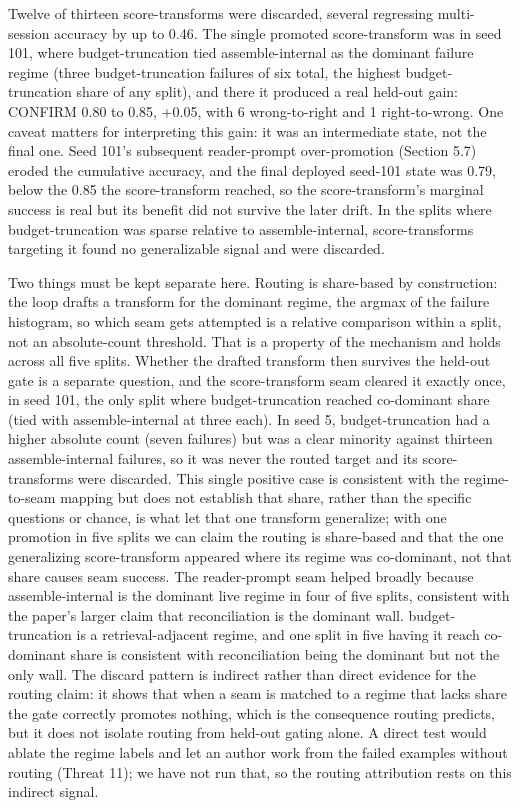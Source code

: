 Twelve of thirteen score-transforms were discarded, several regressing multi-session accuracy by up to 0.46. The single promoted score-transform was in seed 101, where budget-truncation tied assemble-internal as the dominant failure regime (three budget-truncation failures of six total, the highest budget-truncation share of any split), and there it produced a real held-out gain: CONFIRM 0.80 to 0.85, +0.05, with 6 wrong-to-right and 1 right-to-wrong. One caveat matters for interpreting this gain: it was an intermediate state, not the final one. Seed 101's subsequent reader-prompt over-promotion (Section 5.7) eroded the cumulative accuracy, and the final deployed seed-101 state was 0.79, below the 0.85 the score-transform reached, so the score-transform's marginal success is real but its benefit did not survive the later drift. In the splits where budget-truncation was sparse relative to assemble-internal, score-transforms targeting it found no generalizable signal and were discarded.

Two things must be kept separate here. Routing is share-based by construction: the loop drafts a transform for the dominant regime, the argmax of the failure histogram, so which seam gets attempted is a relative comparison within a split, not an absolute-count threshold. That is a property of the mechanism and holds across all five splits. Whether the drafted transform then survives the held-out gate is a separate question, and the score-transform seam cleared it exactly once, in seed 101, the only split where budget-truncation reached co-dominant share (tied with assemble-internal at three each). In seed 5, budget-truncation had a higher absolute count (seven failures) but was a clear minority against thirteen assemble-internal failures, so it was never the routed target and its score-transforms were discarded. This single positive case is consistent with the regime-to-seam mapping but does not establish that share, rather than the specific questions or chance, is what let that one transform generalize; with one promotion in five splits we can claim the routing is share-based and that the one generalizing score-transform appeared where its regime was co-dominant, not that share causes seam success. The reader-prompt seam helped broadly because assemble-internal is the dominant live regime in four of five splits, consistent with the paper's larger claim that reconciliation is the dominant wall. budget-truncation is a retrieval-adjacent regime, and one split in five having it reach co-dominant share is consistent with reconciliation being the dominant but not the only wall. The discard pattern is indirect rather than direct evidence for the routing claim: it shows that when a seam is matched to a regime that lacks share the gate correctly promotes nothing, which is the consequence routing predicts, but it does not isolate routing from held-out gating alone. A direct test would ablate the regime labels and let an author work from the failed examples without routing (Threat 11); we have not run that, so the routing attribution rests on this indirect signal.

